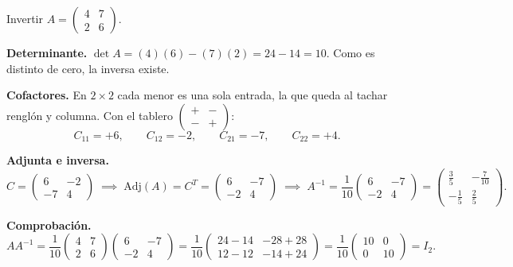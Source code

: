 \documentclass[11pt,letterpaper]{article}
\begin{document}
\begin{ejemplo}
    Invertir $A = \begin{pmatrix} 4 & 7 \\ 2 & 6 \end{pmatrix}$.

    \textbf{Determinante.} $\det A = (4)(6) - (7)(2) = 24 - 14 = 10$.
    Como es distinto de cero, la inversa existe.

    \textbf{Cofactores.} En $2 \times 2$ cada menor es una sola
    entrada, la que queda al tachar renglón y columna. Con el tablero
    $\left(\begin{smallmatrix} + & - \\ - & + \end{smallmatrix}\right)$:
    \[
        C_{11} = +6 , \qquad C_{12} = -2 , \qquad
        C_{21} = -7 , \qquad C_{22} = +4 .
    \]

    \textbf{Adjunta e inversa.}
    \[
        C = \begin{pmatrix} 6 & -2 \\ -7 & 4 \end{pmatrix}
        \;\implies\;
        \mathrm{Adj}(A) = C^{T}
        = \begin{pmatrix} 6 & -7 \\ -2 & 4 \end{pmatrix}
        \;\implies\;
        A^{-1} = \frac{1}{10}
        \begin{pmatrix} 6 & -7 \\ -2 & 4 \end{pmatrix}
        = \begin{pmatrix}
            \tfrac{3}{5} & -\tfrac{7}{10} \\[2pt]
            -\tfrac{1}{5} & \tfrac{2}{5}
        \end{pmatrix} .
    \]

    \textbf{Comprobación.}
    \[
        AA^{-1} = \frac{1}{10}
        \begin{pmatrix} 4 & 7 \\ 2 & 6 \end{pmatrix}
        \begin{pmatrix} 6 & -7 \\ -2 & 4 \end{pmatrix}
        = \frac{1}{10}
        \begin{pmatrix} 24 - 14 & -28 + 28 \\ 12 - 12 & -14 + 24
        \end{pmatrix}
        = \frac{1}{10}
        \begin{pmatrix} 10 & 0 \\ 0 & 10 \end{pmatrix}
        = I_2 .
    \]
\end{ejemplo}
\end{document}
